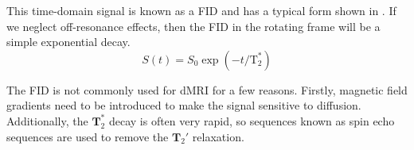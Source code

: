 This time-domain signal is known as a \ac{FID} and has a typical form shown in . 
If we neglect off-resonance effects, then the \ac{FID} in the rotating frame will be a simple exponential decay.
\begin{equation}
  S(t) = S_0\exp(-t/\mathrm{T}_2^*)
  \label{eq:fid_rotframe}
\end{equation}

The \ac{FID} is not commonly used for \ac{dMRI} for a few reasons. Firstly, magnetic field gradients need to be introduced to make the signal sensitive to diffusion. Additionally, the $\mathbf{T}_2^*$ decay is often very rapid, so sequences known as spin echo sequences are used to remove the $\mathbf{T}_2'$ relaxation. 

